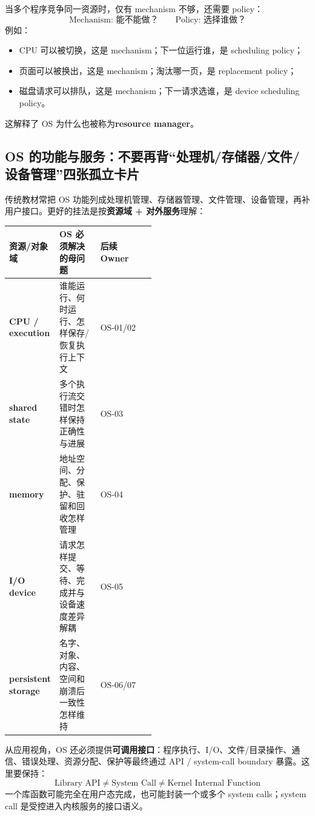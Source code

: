 \documentclass[11pt,a4paper]{ctexart}
\newcommand{\kw}[1]{\textbf{#1}}
\begin{document}
当多个程序竞争同一资源时，仅有 mechanism 不够，还需要 policy：
\[
\boxed{\text{Mechanism: 能不能做？}\qquad\text{Policy: 选择谁做？}}
\]
例如：
\begin{itemize}
  \item CPU 可以被切换，这是 mechanism；下一位运行谁，是 scheduling policy；
  \item 页面可以被换出，这是 mechanism；淘汰哪一页，是 replacement policy；
  \item 磁盘请求可以排队，这是 mechanism；下一请求选谁，是 device scheduling policy。
\end{itemize}

这解释了 OS 为什么也被称为\kw{resource manager}。

\subsection{OS 的功能与服务：不要再背“处理机/存储器/文件/设备管理”四张孤立卡片}

传统教材常把 OS 功能列成处理机管理、存储器管理、文件管理、设备管理，再补用户接口。更好的挂法是按\kw{资源域 + 对外服务}理解：

\begin{center}
\small
\renewcommand{\arraystretch}{1.25}
\begin{tabularx}{\linewidth}{>{\bfseries}p{0.20\linewidth} p{0.28\linewidth} X}
\toprule
资源/对象域 & OS 必须解决的母问题 & 后续 Owner\\
\midrule
CPU / execution & 谁能运行、何时运行、怎样保存/恢复执行上下文 & OS-01/02\\
shared state & 多个执行流交错时怎样保持正确性与进展 & OS-03\\
memory & 地址空间、分配、保护、驻留和回收怎样管理 & OS-04\\
I/O device & 请求怎样提交、等待、完成并与设备速度差异解耦 & OS-05\\
persistent storage & 名字、对象、内容、空间和崩溃后一致性怎样维持 & OS-06/07\\
\bottomrule
\end{tabularx}
\end{center}

从应用视角，OS 还必须提供\kw{可调用接口}：程序执行、I/O、文件/目录操作、通信、错误处理、资源分配、保护等最终通过 API / system-call boundary 暴露。这里要保持：
\[
\boxed{\text{Library API}\neq\text{System Call}\neq\text{Kernel Internal Function}}
\]
一个库函数可能完全在用户态完成，也可能封装一个或多个 system calls；system call 是受控进入内核服务的接口语义。
\end{document}
